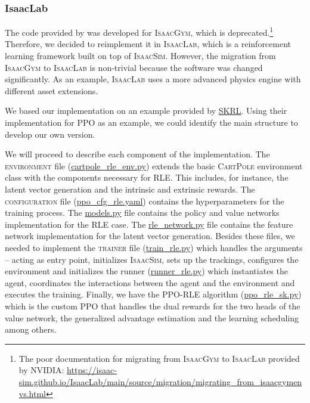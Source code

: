 \documentclass[10pt]{article} %
\begin{document}
\subsubsection{IsaacLab}
The code provided by \cite{rle-paper} was developed for \textsc{IsaacGym}, which is deprecated.\footnote{The poor documentation for migrating from \textsc{IsaacGym} to \textsc{IsaacLab} provided by NVIDIA: \url{https://isaac-sim.github.io/IsaacLab/main/source/migration/migrating_from_isaacgymenvs.html}} Therefore, we decided to reimplement it in \textsc{IsaacLab}, which is a reinforcement learning framework built on top of \textsc{IsaacSim}. However, the migration from \textsc{IsaacGym} to \textsc{IsaacLab} is non-trivial because the software was changed significantly. As an example, \textsc{IsaacLab} uses a more advanced physics engine with different asset extensions.

We based our implementation on an example provided by \href{https://skrl.readthedocs.io/en/latest/#}{SKRL}. Using their implementation for \textsc{PPO} as an example, we could identify the main structure to develop our own version. 

We will proceed to describe each component of the implementation. The \textsc{environment} file (\url{cartpole\_rle\_env.py}) extends the basic \textsc{CartPole} environment class with the components necessary for \textsc{RLE}. This includes, for instance, the latent vector generation and the intrinsic and extrinsic rewards. The \textsc{configuration} file (\url{ppo\_cfg\_rle.yaml}) contains the hyperparameters for the training process. The \url{models.py} file contains the policy and value networks implementation for the \textsc{RLE} case. The \url{rle\_network.py} file contains the feature network implementation for the latent vector generation. Besides these files, we needed to implement the \textsc{trainer} file (\url{train\_rle.py}) which handles the arguments -- acting as entry point, initializes \textsc{IsaacSim}, sets up the trackings, configures the environment and initializes the runner (\url{runner\_rle.py}) which instantiates the agent, coordinates the interactions between the agent and the environment and executes the training. Finally, we have the \textsc{PPO}-\textsc{RLE} algorithm (\url{ppo\_rle\_sk.py}) which is the custom \textsc{PPO} that handles the dual rewards for the two heads of the value network, the generalized advantage estimation and the learning scheduling among others. 
\end{document}
